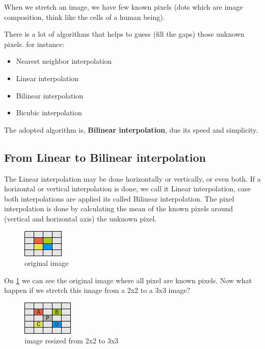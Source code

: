 \documentclass{article}
\begin{document}
	When we stretch an image, we have few known pixels (dots which are image composition, think like the cells of a human being).

	There is a lot of algorithms that helps to guess (fill the gaps) those unknown pixels. for instance:

	\begin{itemize}
	  \item Nearest neighbor interpolation
	  \item Linear interpolation
	  \item Bilinear interpolation
	  \item Bicubic interpolation
	\end{itemize}

	The adopted algorithm is, \textbf{Bilinear interpolation},  due its speed and simplicity.
	
\subsection{From Linear to Bilinear interpolation}

	The Linear interpolation may be done horizontally or vertically, or even both. If a horizontal or vertical interpolation is done, we call it
	Linear interpolation, case both interpolations are applied its called Bilinear interpolation.	
	The pixel interpolation is done by calculating the mean of the known pixels around (vertical and horizontal axis) the unknown pixel. 

	\begin{figure} [H]
		\centering
		\includegraphics[scale=1]{images/bilinear_interpolation_1}
		\caption{original image \label{bilinear1}}
	\end{figure}

	On \ref{bilinear1} we can see the original image where all pixel are known pixels. Now what happen if we stretch this image 
	from a 2x2 to a 3x3 image?
	
	\begin{figure} [H]
		\centering
		\includegraphics[scale=1]{images/bilinear_interpolation_2}
		\caption{image resized from 2x2 to 3x3 \label{bilinear2}}
	\end{figure}
\end{document}
